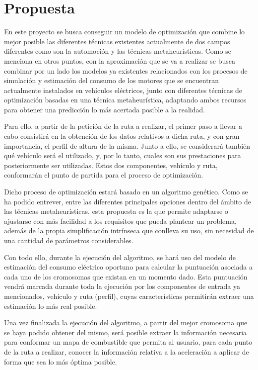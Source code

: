 \documentclass[11pt,spanish,listoffigures,listoftables]{tfgetsinf}
\begin{document}
\section{Propuesta}
En este proyecto se busca conseguir un modelo de optimización que combine lo mejor posible las diferentes técnicas existentes actualmente de dos campos diferentes como son la automoción y las técnicas metaheurísticas. Como se menciona en otros puntos, con la aproximación que se va a realizar se busca combinar por un lado los modelos ya existentes relacionados con los procesos de simulación y estimación del consumo de los motores que se encuentran actualmente instalados en vehículos eléctricos, junto con diferentes técnicas de optimización basadas en una técnica metaheurística, adaptando ambos recursos para obtener una predicción lo más acertada posible a la realidad.

Para ello, a partir de la petición de la ruta a realizar, el primer paso a llevar a cabo consistirá en la obtención de los datos relativos a dicha ruta, y con gran importancia, el perfil de altura de la misma. Junto a ello, se considerará también qué vehículo será el utilizado, y, por lo tanto, cuales son sus prestaciones para posteriormente ser utilizadas. Estos dos componentes, vehículo y ruta, conformarán el punto de partida para el proceso de optimización.

Dicho proceso de optimización estará basado en un algoritmo genético. Como se ha podido entrever, entre las diferentes principales opciones dentro del ámbito de las técnicas metaheurísticas, esta propuesta es la que permite adaptarse o ajustarse con más facilidad a los requisitos que pueda plantear un problema, además de la propia simplificación intrínseca que conlleva su uso, sin necesidad de una cantidad de parámetros considerables.

Con todo ello, durante la ejecución del algoritmo, se hará uso del modelo de estimación del consumo eléctrico oportuno para calcular la puntuación asociada a cada uno de los cromosomas que existan en un momento dado. Esta puntuación vendrá marcada durante toda la ejecución por los componentes de entrada ya mencionados, vehículo y ruta (perfil), cuyas características permitirán extraer una estimación lo más real posible.

Una vez finalizada la ejecución del algoritmo, a partir del mejor cromosoma que se haya podido obtener del mismo, será posible extraer la información necesaria para conformar un mapa de combustible que permita al usuario, para cada punto de la ruta a realizar, conocer la información relativa a la aceleración a aplicar de forma que sea lo más óptima posible.
\end{document}

